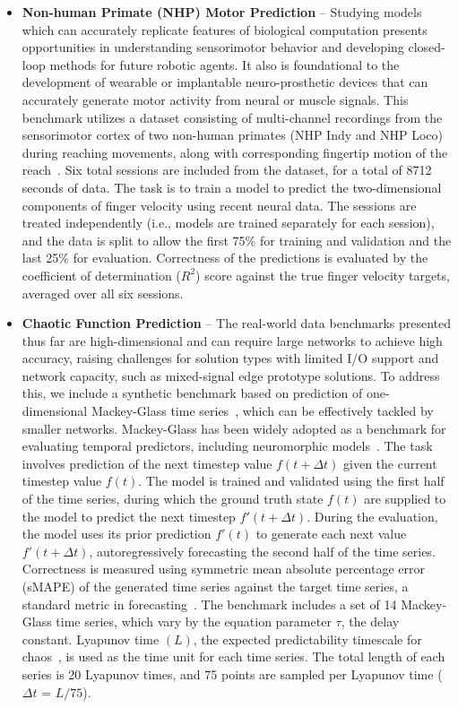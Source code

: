 \begin{itemize}
        \item \textbf{Non-human Primate (NHP) Motor Prediction} --
        Studying models which can accurately replicate features of biological computation presents opportunities in understanding sensorimotor behavior and developing closed-loop methods for future robotic agents. It also is foundational to the development of wearable or implantable neuro-prosthetic devices that can accurately generate motor activity from neural or muscle signals. This benchmark utilizes a dataset consisting of multi-channel recordings from the sensorimotor cortex of two non-human primates (NHP Indy and NHP Loco) during reaching movements, along with corresponding fingertip motion of the reach~\cite{makin-dataset}. Six total sessions are included from the dataset, for a total of 8712 seconds of data. The task is to train a model to predict the two-dimensional components of finger velocity using recent neural data. The sessions are treated independently (i.e., models are trained separately for each session), and the data is split to allow the first 75\% for training and validation and the last 25\% for evaluation. Correctness of the predictions is evaluated by the coefficient of determination ($R^{2}$) score against the true finger velocity targets, averaged over all six sessions.
        
        \item \textbf{Chaotic Function Prediction} --
        The real-world data benchmarks presented thus far are high-dimensional and can require large networks to achieve high accuracy, raising challenges for solution types with limited I/O support and network capacity, such as mixed-signal edge prototype solutions. To address this, we include a synthetic benchmark based on prediction of one-dimensional Mackey-Glass time series~\cite{mackey1977oscillation}, which can be effectively tackled by smaller networks. Mackey-Glass has been widely adopted as a benchmark for evaluating temporal predictors, including neuromorphic models~\cite{jaeger2004harnessing, mukhopadhyay2020learning, chilkuri2021parallelizing}. The task involves prediction of the next timestep value $f(t+\Delta t)$ given the current timestep value $f(t)$. 
        The model is trained and validated using the first half of the time series, during which the ground truth state $f(t)$ are supplied to the model to predict the next timestep $f'(t+\Delta t)$.
        During the evaluation, the model uses its prior prediction $f'(t)$ to generate each next value $f'(t+\Delta t)$, autoregressively forecasting the second half of the time series.
        Correctness is measured using symmetric mean absolute percentage error (sMAPE) of the generated time series against the target time series, a standard metric in forecasting~\cite{MAKRIDAKIS202054}.
        The benchmark includes a set of 14 Mackey-Glass time series, which vary by the equation parameter $\tau$, the delay constant. Lyapunov time $(L)$, the expected predictability timescale for chaos~\cite{gilpin2023largescale}, is used as the time unit for each time series. The total length of each series is 20 Lyapunov times, and 75 points are sampled per Lyapunov time ($\Delta t$ = $L/75$).

    \end{itemize}
